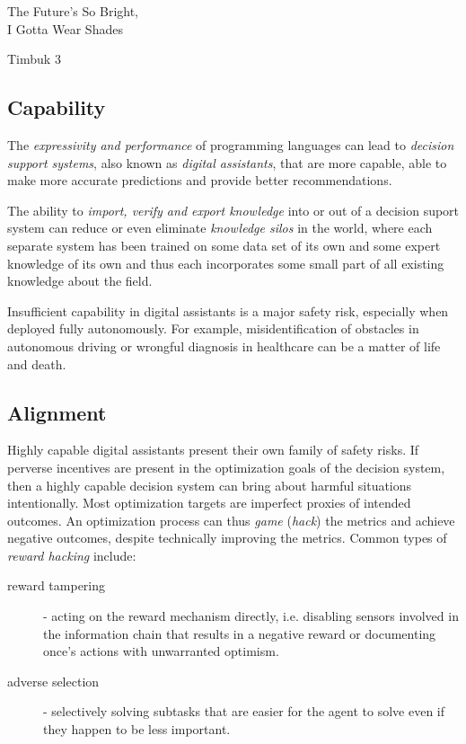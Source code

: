 \epigraph{The Future's So Bright, \\ I Gotta Wear Shades}{Timbuk 3}

\subsection{Capability}

The \emph{expressivity and performance} of programming languages can lead to \emph{decision support systems}, also known as \emph{digital assistants}, that are more capable, able to make more accurate predictions and provide better recommendations.

The ability to \emph{import, verify and export knowledge} into or out of a decision suport system can reduce or even eliminate \emph{knowledge silos} in the world, where each separate system has been trained on some data set of its own and some expert knowledge of its own and thus each incorporates some small part of all existing knowledge about the field. 

Insufficient capability in digital assistants is a major safety risk, especially when deployed fully autonomously. For example, misidentification of obstacles in autonomous driving \cite{sheebajoiceObstacleDetectionSafe2023} or wrongful diagnosis in healthcare \cite{wintersDiagnosticErrorsIntensive2012} can be a matter of life and death.

\subsection{Alignment}

Highly capable digital assistants present their own family of safety risks. 
If perverse incentives are present in the optimization goals of the decision system, then a highly capable decision system can bring about harmful situations intentionally.
Most optimization targets are imperfect proxies of intended outcomes. 
An optimization process can thus \emph{game} (\emph{hack}) the metrics and achieve negative outcomes, despite technically improving the metrics.
Common types of \emph{reward hacking} \cite{skalseDefiningCharacterizingReward2022} include:
\begin{description}
    \item[reward tampering] \cite{everittRewardTamperingProblems2021, skalseInvariancePolicyOptimisation2023} - acting on the reward mechanism directly, i.e. disabling sensors involved in the information chain that results in a negative reward or documenting once's actions with unwarranted optimism.
    \item[adverse selection] - selectively solving subtasks that are easier for the agent to solve even if they happen to be less important.
\end{description}

